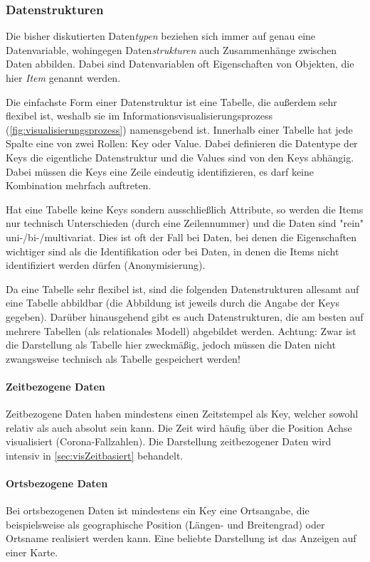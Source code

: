 		\subsubsection{Datenstrukturen}
			Die bisher diskutierten Daten\emph{typen} beziehen sich immer auf genau eine Datenvariable, wohingegen Daten\emph{strukturen} auch Zusammenhänge zwischen Daten abbilden. Dabei sind Datenvariablen oft Eigenschaften von Objekten, die hier \emph{Item} genannt werden.

			Die einfachste Form einer Datenstruktur ist eine Tabelle, die außerdem sehr flexibel ist, weshalb sie im Informationsvisualisierungsprozess (\autoref{fig:visualisierungsprozess}) namensgebend ist. Innerhalb einer Tabelle hat jede Spalte eine von zwei Rollen: Key oder Value. Dabei definieren die Datentype der Keys die eigentliche Datenstruktur und die Values sind von den Keys abhängig. Dabei müssen die Keys eine Zeile eindeutig identifizieren, \dh es darf keine Kombination mehrfach auftreten.

			Hat eine Tabelle keine Keys sondern ausschließlich Attribute, so werden die Items nur technisch Unterschieden (\bspw durch eine Zeilennummer) und die Daten sind "rein" uni-/bi-/multivariat. Dies ist oft der Fall bei Daten, bei denen die Eigenschaften wichtiger sind als die Identifikation oder bei Daten, in denen die Items nicht identifiziert werden dürfen (Anonymisierung).

			Da eine Tabelle sehr flexibel ist, sind die folgenden Datenstrukturen allesamt auf eine Tabelle abbildbar (die Abbildung ist jeweils durch die Angabe der Keys gegeben). Darüber hinausgehend gibt es auch Datenstrukturen, die am besten auf mehrere Tabellen (als relationales Modell) abgebildet werden. Achtung: Zwar ist die Darstellung als Tabelle hier zweckmäßig, jedoch müssen die Daten nicht zwangsweise technisch als Tabelle gespeichert werden!

			\paragraph{Zeitbezogene Daten}
				Zeitbezogene Daten haben mindestens einen Zeitstempel als Key, welcher sowohl relativ als auch absolut sein kann. Die Zeit wird häufig über die Position Achse visualisiert (\zB Corona-Fallzahlen). Die Darstellung zeitbezogener Daten wird intensiv in \autoref{sec:visZeitbasiert} behandelt.

			\paragraph{Ortsbezogene Daten}
				Bei ortsbezogenen Daten ist mindestens ein Key eine Ortsangabe, die beispielsweise als geographische Position (Längen- und Breitengrad) oder Ortsname realisiert werden kann. Eine beliebte Darstellung ist das Anzeigen auf einer Karte.

